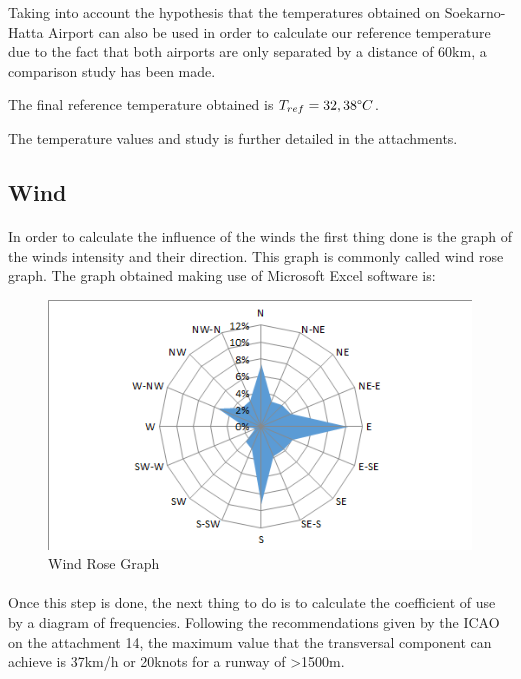 		Taking into account the hypothesis that the temperatures obtained on Soekarno-Hatta Airport can also be used in order to calculate our reference temperature due to the fact that both airports are only separated by a distance of 60km, a comparison study has been made. 
		
		The final reference temperature obtained is \(T_{ref}= 32,38\degree C\). 
		
		The temperature values and study is further detailed in the attachments.
		
		\subsection{Wind}
		\paragraph{}In order to calculate the influence of the winds the first thing done is the graph of the winds intensity and their direction. This graph is commonly called wind rose graph. The graph obtained making use of Microsoft Excel software is:
		
		\begin{figure}[H]
			\centering
			\includegraphics[clip, trim=0.03cm 0cm 0cm 0.03cm, width=1\textwidth]{./images/WIND/ROSE}
			\caption{Wind Rose Graph} %
			\label{} %
		\end{figure}
		
		\paragraph{}Once this step is done, the next thing to do is to calculate the coefficient of use by a diagram of
		frequencies. Following the recommendations given by the ICAO on the attachment 14, the maximum value that the transversal component can achieve is 37km/h or 20knots for a runway of >1500m.
		
